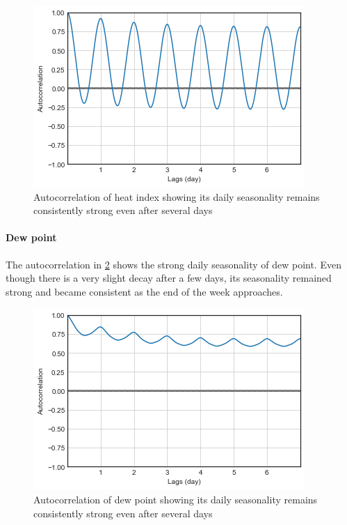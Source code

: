 \begin{figure}
  \includegraphics[width=\linewidth]
  {figures/figure_autocorr_heatindex.png}
  \caption{ Autocorrelation of heat index showing its daily seasonality remains consistently strong even after several days}
  \label{figure_autocorr_heatindex}
\end{figure}



\paragraph{Dew point}


The autocorrelation in \ref{figure_autocorr_dewpoint} shows the strong daily seasonality of dew point. Even though there is a very slight decay after a few days, its seasonality remained strong and became consistent as the end of the week approaches. 


\begin{figure}
  \includegraphics[width=\linewidth]
  {figures/figure_autocorr_dewpoint.png}
  \caption{ Autocorrelation of dew point showing its daily seasonality remains consistently strong even after several days}
  \label{figure_autocorr_dewpoint}
\end{figure}


